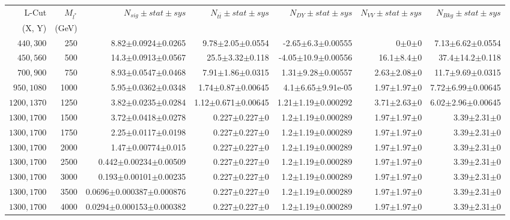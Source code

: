 \documentclass[]{article}
\begin{document}
\begin{table}
\begin{center}
\scriptsize{
\begin{tabular}{ |r|r|r|r|r|r|r|}
\hline 
L-Cut & $M_{l^*}$ & $N_{sig}\pm stat \pm sys $ &$N_{t\bar{t}}\pm stat \pm sys $ & $N_{DY}\pm stat \pm sys $ & $N_{VV}\pm stat \pm sys $ &$N_{Bkg}\pm stat \pm sys$\\
(X, Y) & (GeV) & && &&\\
\hline 
$440, 300$ & 250 & 8.82$\pm$0.0924$\pm$0.0265 & 9.78$\pm$2.05$\pm$0.0554 & -2.65$\pm$6.3$\pm$0.00555 & 0$\pm$0$\pm$0 & 7.13$\pm$6.62$\pm$0.0554 \\
$450, 560$ & 500 & 14.3$\pm$0.0913$\pm$0.0567 & 25.5$\pm$3.32$\pm$0.118 & -4.05$\pm$10.9$\pm$0.00556 & 16.1$\pm$8.4$\pm$0 & 37.4$\pm$14.2$\pm$0.118 \\
$700, 900$ & 750 & 8.93$\pm$0.0547$\pm$0.0468 & 7.91$\pm$1.86$\pm$0.0315 & 1.31$\pm$9.28$\pm$0.00557 & 2.63$\pm$2.08$\pm$0 & 11.7$\pm$9.69$\pm$0.0315 \\
$950, 1080$ & 1000 & 5.95$\pm$0.0362$\pm$0.0348 & 1.74$\pm$0.87$\pm$0.00645 & 4.1$\pm$6.65$\pm$9.91e-05 & 1.97$\pm$1.97$\pm$0 & 7.72$\pm$6.99$\pm$0.00645 \\
$1200, 1370$ & 1250 & 3.82$\pm$0.0235$\pm$0.0284 & 1.12$\pm$0.671$\pm$0.00645 & 1.21$\pm$1.19$\pm$0.000292 & 3.71$\pm$2.63$\pm$0 & 6.02$\pm$2.96$\pm$0.00645 \\
$1300, 1700$ & 1500 & 3.72$\pm$0.0418$\pm$0.0278 & 0.227$\pm$0.227$\pm$0 & 1.2$\pm$1.19$\pm$0.000289 & 1.97$\pm$1.97$\pm$0 & 3.39$\pm$2.31$\pm$0 \\
$1300, 1700$ & 1750 & 2.25$\pm$0.0117$\pm$0.0198 & 0.227$\pm$0.227$\pm$0 & 1.2$\pm$1.19$\pm$0.000289 & 1.97$\pm$1.97$\pm$0 & 3.39$\pm$2.31$\pm$0 \\
$1300, 1700$ & 2000 & 1.47$\pm$0.00774$\pm$0.015 & 0.227$\pm$0.227$\pm$0 & 1.2$\pm$1.19$\pm$0.000289 & 1.97$\pm$1.97$\pm$0 & 3.39$\pm$2.31$\pm$0 \\
$1300, 1700$ & 2500 & 0.442$\pm$0.00234$\pm$0.00509 & 0.227$\pm$0.227$\pm$0 & 1.2$\pm$1.19$\pm$0.000289 & 1.97$\pm$1.97$\pm$0 & 3.39$\pm$2.31$\pm$0 \\
$1300, 1700$ & 3000 & 0.193$\pm$0.00101$\pm$0.00235 & 0.227$\pm$0.227$\pm$0 & 1.2$\pm$1.19$\pm$0.000289 & 1.97$\pm$1.97$\pm$0 & 3.39$\pm$2.31$\pm$0 \\
$1300, 1700$ & 3500 & 0.0696$\pm$0.000387$\pm$0.000876 & 0.227$\pm$0.227$\pm$0 & 1.2$\pm$1.19$\pm$0.000289 & 1.97$\pm$1.97$\pm$0 & 3.39$\pm$2.31$\pm$0 \\
$1300, 1700$ & 4000 & 0.0294$\pm$0.000153$\pm$0.000382 & 0.227$\pm$0.227$\pm$0 & 1.2$\pm$1.19$\pm$0.000289 & 1.97$\pm$1.97$\pm$0 & 3.39$\pm$2.31$\pm$0 \\

\end{tabular}}
\end{center}
\end{table}
\end{document}
